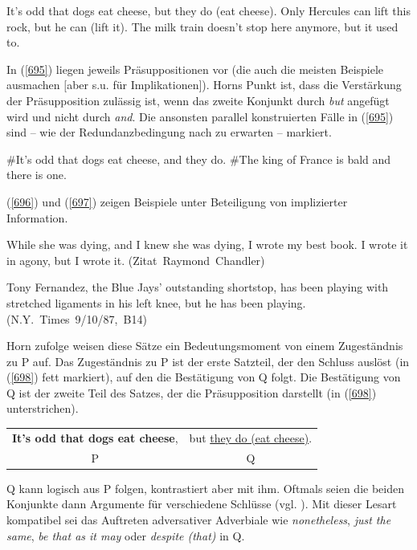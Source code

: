 \begin{exe}
	\ex\label{694} 
		\begin{xlist}	
			\ex\label{694a} It’s odd that dogs eat cheese, but they do (eat cheese).
			\ex\label{694b} Only Hercules can lift this rock, but he can (lift it).	
			\ex\label{694c} The milk train doesn’t stop here anymore, but it used to.
			\hfill\hbox {\citet[322]{Horn1991}}
		\end{xlist}
\end{exe}	
In (\ref{695}) liegen jeweils Präsuppositionen  vor (die auch die meisten Beispiele ausmachen $[$aber s.u. für Implikationen$]$). Horns Punkt ist, dass die Verstärkung der Präsupposition zulässig ist, wenn das zweite Konjunkt durch \textit{but} angefügt wird und nicht durch \textit{and}. Die ansonsten parallel konstruierten Fälle in (\ref{695}) sind – wie der Redundanzbedingung  nach zu erwarten – markiert.
\begin{exe}
	\ex\label{695} 
		\begin{xlist}	
			\ex\label{695a} \#It’s odd that dogs eat cheese, and they do.
			\ex\label{695b} \#The king of France is bald and there is one.	
			\hfill\hbox {\citet[318/321]{Horn1991}}
		\end{xlist}
\end{exe}						
(\ref{696}) und (\ref{697}) zeigen Beispiele unter Beteiligung von implizierter Information.
\begin{exe}
	\ex\label{696} 
	While she was dying, and I knew she was dying, I wrote my best book. I wrote it in agony, but I wrote it. 		
	\hfill\hbox {(Zitat Raymond Chandler)}
	\newline
	\hbox{}\hfill\hbox {\citet[322,Fn 12]{Horn1991}}	
\end{exe}
\begin{exe}
	\ex\label{697} 
	Tony Fernandez, the Blue Jays' outstanding shortstop, has been playing with stretched ligaments in his left knee, but he 		has been playing.
	\newline
	\hbox{}\hfill\hbox {(N.Y. Times 9/10/87, B14)}
	\newline
	\hbox{}\hfill\hbox {\citet[327]{Horn1991}}	
\end{exe}
Horn zufolge weisen diese Sätze ein Bedeutungsmoment von einem Zugeständnis zu P auf. Das Zugeständnis zu P ist der erste Satzteil, der den Schluss auslöst (in (\ref{698}) fett markiert), auf den die Bestätigung von Q folgt. Die Bestätigung von Q ist der zweite Teil des Satzes, der die Präsupposition darstellt (in (\ref{698}) unterstrichen).
\begin{exe}
	\ex\label{698} 
	\begin{tabular}[t]{cc}
	\textbf{It's odd that dogs eat cheese}, & but \underline{they do (eat cheese)}.\\
	P & Q
    \end{tabular}
\end{exe}
Q kann logisch aus P folgen, kontrastiert aber mit ihm. Oftmals seien die beiden Konjunkte dann Argumente für verschiedene Schlüsse (vgl. \citeyear[325]{Horn1991}). Mit dieser Lesart kompatibel sei das Auftreten adversativer Adverbiale wie \textit{nonetheless}, \textit{just the same}, \textit{be that as it may} oder \textit{despite (that)} in Q.

